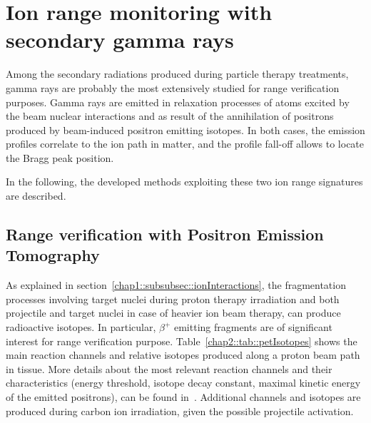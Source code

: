 \section{Ion range monitoring with secondary gamma rays}\label{chap2::sec::GammaIonRange}

Among the secondary radiations produced during particle therapy treatments, gamma rays are probably the most extensively studied for range verification purposes. Gamma rays are emitted in relaxation processes of atoms excited by the beam nuclear interactions and as result of the annihilation of positrons produced by beam-induced positron emitting isotopes. In both cases, the emission profiles correlate to the ion path in matter, and the profile fall-off allows to locate the Bragg peak position. 

In the following, the developed methods exploiting these two ion range signatures are described.

\subsection{Range verification with Positron Emission Tomography}\label{chap2::subsec::PETrangeVerif}

As explained in section~\ref{chap1::subsubsec::ionInteractions}, the fragmentation processes involving target nuclei during proton therapy irradiation and both projectile and target nuclei in case of heavier ion beam therapy, can produce radioactive isotopes. In particular, $\beta^+$ emitting fragments are of significant interest for range verification purpose. Table~\ref{chap2::tab::petIsotopes} shows the main reaction channels and relative isotopes produced along a proton beam path in tissue. More details about the most relevant reaction channels and their characteristics (energy threshold, isotope decay constant, maximal kinetic energy of the emitted positrons), can be found in~\cite{Oelfke1996}. Additional channels and isotopes are produced during carbon ion irradiation, given the possible projectile activation. 

